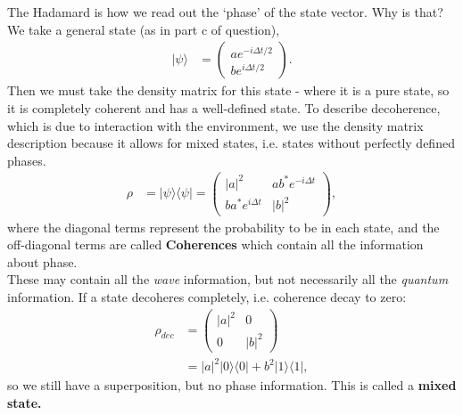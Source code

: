 \documentclass[lasers.tex]{subfiles}
\begin{document}
\chapter{}

\begin{example}
    The Hadamard is how we read out the `phase' of the state vector. 
    Why is that?
    We take a general state (as in part c of question),
    \begin{align}
        |\psi\rangle &= \begin{pmatrix} ae^{-i\Delta t/2} \\ be^{i\Delta t/2} \end{pmatrix}.
    \end{align}
    Then we must take the density matrix for this state - where it is a pure state, so it is completely coherent and has a well-defined state.
    To describe decoherence, which is due to interaction with the environment, we use the density matrix description because it allows for mixed states, i.e. states without perfectly defined phases.
    \begin{align}
        \rho &= |\psi\rangle\langle\psi| = \begin{pmatrix} |a|^2 & ab^*e^{-i\Delta t} \\ ba^*e^{i\Delta t} & |b|^2 \end{pmatrix},
    \end{align}
    where the diagonal terms represent the probability to be in each state, and the off-diagonal terms are called \textbf{Coherences} which contain all the information about phase.\\
    These may contain all the \emph{wave} information, but not necessarily all the \emph{quantum} information. 
    If a state decoheres completely, i.e. coherence decay to zero:
    \begin{align}
        \rho_{dec} &= \begin{pmatrix} |a|^2 & 0 \\ 0 & |b|^2\end{pmatrix}\\
                   &= |a|^2|0\rangle\langle0| + b^2|1\rangle\langle1|,
    \end{align}
    so we still have a superposition, but no phase information. 
    This is called a \textbf{mixed state.}


\end{example}
\end{document}
